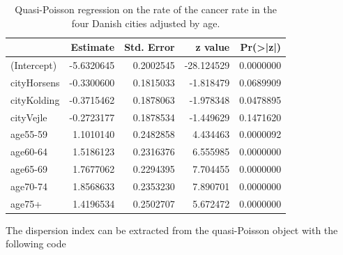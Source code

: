\documentclass[
]{book}
\newenvironment{Shaded}{\begin{snugshade}}{\end{snugshade}}
\newcommand{\AttributeTok}[1]{\textcolor[rgb]{0.13,0.29,0.53}{#1}}
\newcommand{\CommentTok}[1]{\textcolor[rgb]{0.56,0.35,0.01}{\textit{#1}}}
\newcommand{\DecValTok}[1]{\textcolor[rgb]{0.00,0.00,0.81}{#1}}
\newcommand{\FunctionTok}[1]{\textcolor[rgb]{0.13,0.29,0.53}{\textbf{#1}}}
\newcommand{\NormalTok}[1]{#1}
\newcommand{\OtherTok}[1]{\textcolor[rgb]{0.56,0.35,0.01}{#1}}
\newcommand{\SpecialCharTok}[1]{\textcolor[rgb]{0.81,0.36,0.00}{\textbf{#1}}}
\begin{document}
\begin{table}

\caption{\label{tab:unnamed-chunk-173}Quasi-Poisson regression on the rate of the cancer rate in the four Danish cities adjusted by age.}
\centering
\begin{tabular}[t]{l|r|r|r|r}
\hline
  & Estimate & Std. Error & z value & Pr(>|z|)\\
\hline
(Intercept) & -5.6320645 & 0.2002545 & -28.124529 & 0.0000000\\
\hline
cityHorsens & -0.3300600 & 0.1815033 & -1.818479 & 0.0689909\\
\hline
cityKolding & -0.3715462 & 0.1878063 & -1.978348 & 0.0478895\\
\hline
cityVejle & -0.2723177 & 0.1878534 & -1.449629 & 0.1471620\\
\hline
age55-59 & 1.1010140 & 0.2482858 & 4.434463 & 0.0000092\\
\hline
age60-64 & 1.5186123 & 0.2316376 & 6.555985 & 0.0000000\\
\hline
age65-69 & 1.7677062 & 0.2294395 & 7.704455 & 0.0000000\\
\hline
age70-74 & 1.8568633 & 0.2353230 & 7.890701 & 0.0000000\\
\hline
age75+ & 1.4196534 & 0.2502707 & 5.672472 & 0.0000000\\
\hline
\end{tabular}
\end{table}

The dispersion index can be extracted from the quasi-Poisson object with the following code

\begin{Shaded}
\end{Shaded}
\end{document}
